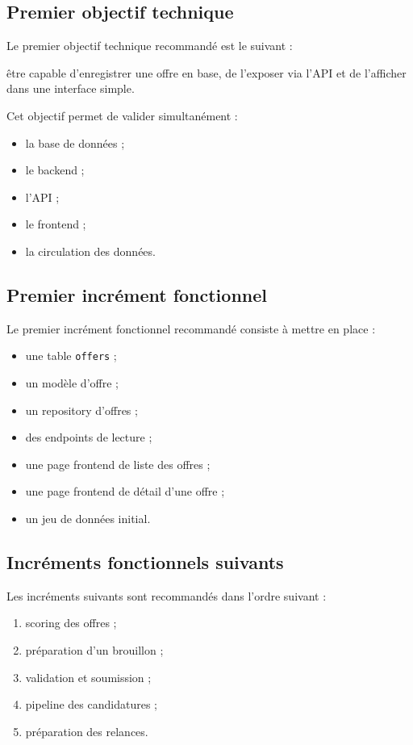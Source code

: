 \documentclass[11pt,a4paper]{article}
\begin{document}
\subsection{Premier objectif technique}

Le premier objectif technique recommandé est le suivant :

\begin{center}
être capable d’enregistrer une offre en base, de l’exposer via l’API et de l’afficher dans une interface simple.
\end{center}

Cet objectif permet de valider simultanément :

\begin{itemize}
    \item la base de données ;
    \item le backend ;
    \item l’API ;
    \item le frontend ;
    \item la circulation des données.
\end{itemize}

\subsection{Premier incrément fonctionnel}

Le premier incrément fonctionnel recommandé consiste à mettre en place :

\begin{itemize}
    \item une table \texttt{offers} ;
    \item un modèle d’offre ;
    \item un repository d’offres ;
    \item des endpoints de lecture ;
    \item une page frontend de liste des offres ;
    \item une page frontend de détail d’une offre ;
    \item un jeu de données initial.
\end{itemize}

\subsection{Incréments fonctionnels suivants}

Les incréments suivants sont recommandés dans l’ordre suivant :

\begin{enumerate}
    \item scoring des offres ;
    \item préparation d’un brouillon ;
    \item validation et soumission ;
    \item pipeline des candidatures ;
    \item préparation des relances.
\end{enumerate}
\end{document}
